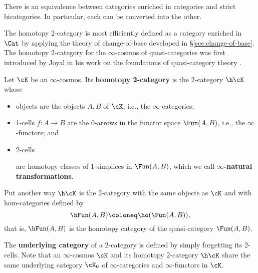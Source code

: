 \begin{proposition}\label{prop:2-cat-as-cat-enriched} There is an equivalence between categories enriched in categories and strict bicategories. In particular, each can be converted into the other.
\end{proposition}

The homotopy 2-category is most efficiently defined as a category enriched in $\Cat$ by applying the theory of change-of-base developed in \S\ref{sec:change-of-base}. The homotopy 2-category for the $\infty$-cosmos of quasi-categories was first introduced by Joyal in his work on the foundations of quasi-category theory \cite{Joyal:2008tq}.

\begin{definition}\label{defn:homotopy-2-cat}
   Let $\cK$ be an $\infty$-cosmos. Its \textbf{homotopy 2-category} is the 2-category $\h\cK$ whose
\begin{itemize}
\item objects are the objects $A, B$ of $\cK$, i.e., the $\infty$-categories;\item 1-cells $f \colon A \to B$ are the 0-arrows in the functor space $\Fun(A,B)$, i.e., the $\infty$-functors; and
\item 2-cells
\begin{center}
\end{center}
 are homotopy classes of 1-simplices in $\Fun(A,B)$, which we call \textbf{$\infty$-natural transformations}.
\end{itemize}
Put another way $\h\cK$ is the 2-category with the same objects as $\cK$ and with hom-categories defined by
\[ \hFun(A,B)   \coloneq \ho(\Fun(A,B)),\]
that is, $\hFun(A,B)$ is the homotopy category of the quasi-category $\Fun(A,B)$.
\end{definition}

\begin{definition}\label{defn:underlying-cat-of-2cat}
The \textbf{underlying category} of a 2-category is defined by simply forgetting its 2-cells. Note that an $\infty$-cosmos $\cK$ and its homotopy 2-category $\h\cK$ share the same underlying category $\cK_0$ of $\infty$-categories and $\infty$-functors in $\cK$.
\end{definition}


